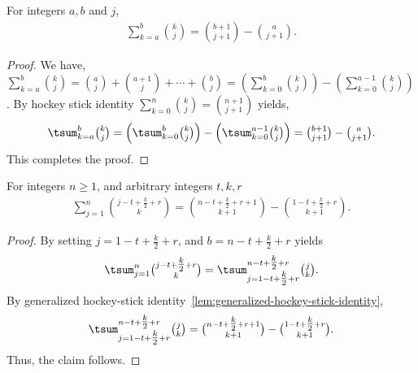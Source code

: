 \begin{lemma}
  \label{lem:generalized-hockey-stick-identity}
  For integers $a,b$ and $j$,
  \begin{align*}
    \sum_{k=a}^{b} \binom{k}{j} = \binom{b+1}{j+1} - \binom{a}{j+1}.
  \end{align*}
  \begin{proof}
    We have,
    $\sum_{k=a}^{b} \binom{k}{j}
    = \binom{a}{j} + \binom{a+1}{j} + \cdots + \binom{b}{j}
    = \left( \sum_{k=0}^{b} \binom{k}{j} \right) - \left( \sum_{k=0}^{a-1} \binom{k}{j} \right)$.
    By hockey stick identity $\sum_{k=0}^{n} \binom{k}{j} = \binom{n+1}{j+1}$ yields,
    \begin{align*}
      \tsum_{k=a}^{b} \tbinom{k}{j}
      = \left( \tsum_{k=0}^{b} \tbinom{k}{j} \right) - \left( \tsum_{k=0}^{a-1} \tbinom{k}{j} \right)
      = \tbinom{b+1}{j+1} - \tbinom{a}{j+1}.
    \end{align*}
    This completes the proof.
  \end{proof}
\end{lemma}

\begin{lemma}
  \label{lem:centered-hockey-stick-identity}
  For integers $n\geq1$, and arbitrary integers $t,k,r$
  \begin{align*}
    \sum_{j=1}^{n} \binom{j -t + \frac{k}{2} +r}{k}
    = \binom{n -t + \frac{k}{2} + r +1}{k+1} - \binom{1 -t + \tfrac{k}{2} +r}{k+1}.
  \end{align*}
  \begin{proof}
    By setting $j=1 -t + \tfrac{k}{2} +r$, and $b=n-t+ \tfrac{k}{2} +r$ yields
    \begin{align*}
      \tsum_{j=1}^{n} \tbinom{j -t + \tfrac{k}{2} +r}{k} =
      \tsum_{j=1 -t + \tfrac{k}{2} +r}^{n -t + \tfrac{k}{2} +r} \tbinom{j}{k}.
    \end{align*}
    By generalized hockey-stick identity~\eqref{lem:generalized-hockey-stick-identity},
    \begin{align*}
      \tsum_{j=1 -t + \tfrac{k}{2} +r}^{n -t + \tfrac{k}{2} +r} \tbinom{j}{k}
      = \tbinom{n -t + \tfrac{k}{2} + r +1}{k+1} - \tbinom{1 -t + \tfrac{k}{2} +r}{k+1}.
    \end{align*}
    Thus, the claim follows.
  \end{proof}
\end{lemma}
